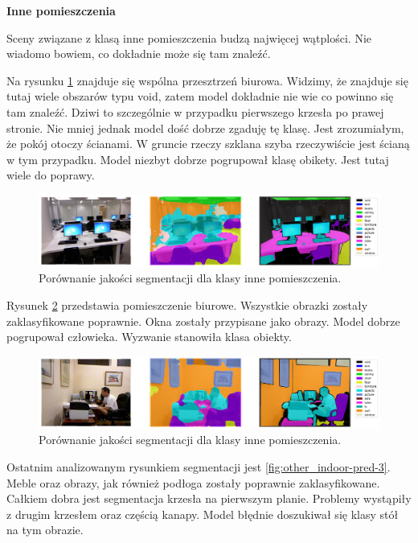 \noindent
\textbf{Inne pomieszczenia}

Sceny związane z klasą inne pomieszczenia budzą najwięcej wątplości. Nie wiadomo bowiem, co dokładnie może się tam znaleźć.

Na rysunku \ref{fig:other_indoor-pred-1} znajduje się wspólna przesztrzeń biurowa. Widzimy, że znajduje się tutaj wiele obszarów typu void, zatem model dokładnie nie wie co powinno się tam znaleźć. Dziwi to szczególnie w przypadku pierwszego krzesła po prawej stronie. Nie mniej jednak model dość dobrze zgaduję tę klasę. Jest zrozumiałym, że pokój otoczy ścianami. W gruncie rzeczy szklana szyba rzeczywiście jest ścianą w tym przypadku. Model niezbyt dobrze pogrupował klasę obikety. Jest tutaj wiele do poprawy.

\begin{figure}[ht!]
    \centering
    \includegraphics[width=\textwidth]{img/preds_analysis/gt_vs_pred/other_indoor-1.png}
    \caption{Porównanie jakości segmentacji dla klasy inne pomieszczenia.}
    \label{fig:other_indoor-pred-1}
\end{figure}

Rysunek \ref{fig:other_indoor-pred-2} przedstawia pomieszczenie biurowe. Wszystkie obrazki zostały zaklasyfikowane poprawnie. Okna zostały przypisane jako obrazy. Model dobrze pogrupował człowieka. Wyzwanie stanowiła klasa obiekty.

\begin{figure}[ht!]
    \centering
    \includegraphics[width=\textwidth]{img/preds_analysis/gt_vs_pred/other_indoor-2.png}
    \caption{Porównanie jakości segmentacji dla klasy inne pomieszczenia.}
    \label{fig:other_indoor-pred-2}
\end{figure}

Ostatnim analizowanym rysunkiem segmentacji jest \ref{fig:other_indoor-pred-3}. Meble oraz obrazy, jak również podłoga zostały poprawnie zaklasyfikowane. Całkiem dobra jest segmentacja krzesła na pierwszym planie. Problemy wystąpiły z drugim krzesłem oraz częścią kanapy. Model błędnie doszukiwał się klasy stół na tym obrazie.

